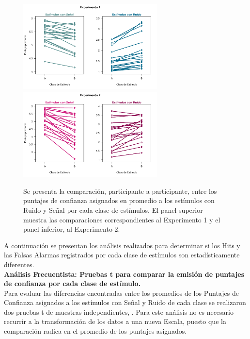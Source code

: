 \begin{figure}[th]
\centering
\includegraphics[width=0.65\textwidth]{Figures/Diff_Rating_E1}\\ 
\includegraphics[width=0.65\textwidth]{Figures/Diff_Rating_E2}\\
\caption[Diferencias entre los Puntajes de Confianza promedio asignados a los estímulos con Señal y Ruido de cada clase]{Se presenta la comparación, participante a participante, entre los puntajes de confianza asignados en promedio a los estímulos con Ruido y Señal por cada clase de estímulos. El panel superior muestra las comparaciones correspondientes al Experimento 1 y el panel inferior, al Experimento 2.}
\label{fig:Diff_Ratings}
\end{figure}

A continuación se presentan los análisis realizados para determinar si los Hits y las Falsas Alarmas registrados por cada clase de estímulos son estadísticamente diferentes.\\

\textbf{Análisis Frecuentista: Pruebas t para comparar la emisión de puntajes de confianza por cada clase de estímulo.}\\

Para evaluar las diferencias encontradas entre los promedios de los Puntajes de Confianza asignados a los estímulos con Señal y Ruido de cada clase se realizaron  dos pruebas-t de muestras independientes, \parencite{Glanzer1990}. Para este análisis no es necesario recurrir a la transformación de los datos a una nueva Escala, puesto que la comparación radica en el promedio de los puntajes asignados.\\

